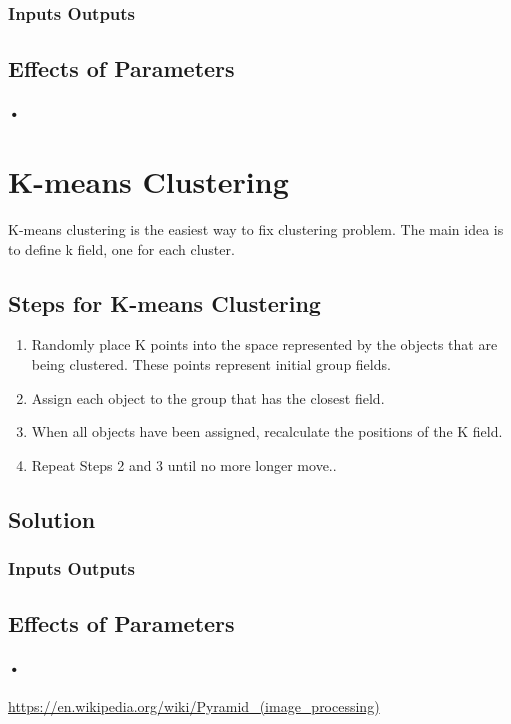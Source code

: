 \documentclass[12pt]{article}
\begin{document}
\subsubsection{Inputs Outputs}


\subsection{Effects of Parameters}
\paragraph{•}

\section{K-means Clustering}
K-means clustering is the easiest way to fix clustering problem. The main idea is to define k field, one for each cluster. 
\subsection*{Steps for K-means Clustering}
\begin{enumerate}
\item Randomly place K points into the space represented by the objects that are being clustered. These points represent initial group fields.
\item Assign each object to the group that has the closest field.
\item When all objects have been assigned, recalculate the positions of the K field.
\item Repeat Steps 2 and 3 until no more longer move..
\end{enumerate}
\subsection{Solution}


\subsubsection{Inputs Outputs}


\subsection{Effects of Parameters}
\paragraph{•}



  \begin{thebibliography}{1}
   \url{https://en.wikipedia.org/wiki/Pyramid_(image_processing)}
  \end{thebibliography}             
\end{document}
